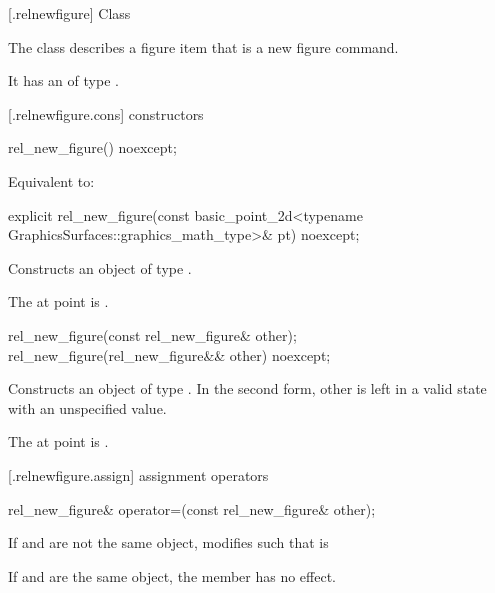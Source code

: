  [\iotwod.relnewfigure] {Class }%

\pnum
{}%
The class  describes a figure item that is a new figure command.

\pnum
It has an  of type .

 [\iotwod.relnewfigure.cons] { constructors}%

%
\begin{itemdecl}
rel_new_figure() noexcept;
\end{itemdecl}
\begin{itemdescr}
\pnum
\effects
Equivalent to: 
\end{itemdescr}

%
\begin{itemdecl}
explicit rel_new_figure(const basic_point_2d<typename
  GraphicsSurfaces::graphics_math_type>& pt) noexcept;
\end{itemdecl}
\begin{itemdescr}
\pnum
\effects
Constructs an object of type .

\pnum
The at point is .
\end{itemdescr}

%
\begin{itemdecl}
rel_new_figure(const rel_new_figure& other);
rel_new_figure(rel_new_figure&& other) noexcept;
\end{itemdecl}
\begin{itemdescr}
\pnum
\effects
Constructs an object of type . In the second form, other is left in a valid state with an unspecified value.

\pnum
The at point is .
\end{itemdescr}

 [\iotwod.relnewfigure.assign] { assignment operators}%

%
\begin{itemdecl}
rel_new_figure& operator=(const rel_new_figure& other);
\end{itemdecl}
\begin{itemdescr}
\pnum
\effects
If  and  are not the same object, modifies  such that  is 

\pnum
If  and  are the same object, the member has no effect.

\pnum
\returns
{}
\end{itemdescr}

